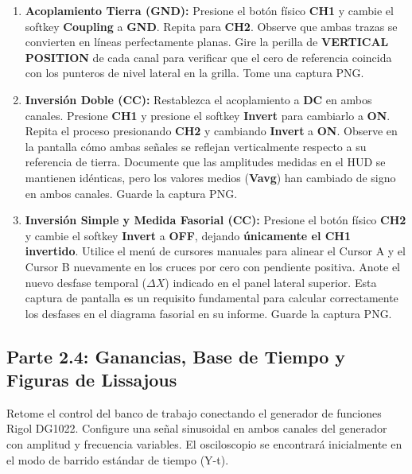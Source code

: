 \documentclass[12pt, letterpaper]{article}
\begin{document}
\begin{enumerate}[label=\textbf{2.3.\alph*)}]
    \item \textbf{Acoplamiento Tierra (GND):} Presione el botón físico \textbf{CH1} y cambie el softkey \textbf{Coupling} a \textbf{GND}. Repita para \textbf{CH2}. Observe que ambas trazas se convierten en líneas perfectamente planas. Gire la perilla de \textbf{VERTICAL POSITION} de cada canal para verificar que el cero de referencia coincida con los punteros de nivel lateral en la grilla. Tome una captura PNG.
    
    \item \textbf{Inversión Doble (CC):} Restablezca el acoplamiento a \textbf{DC} en ambos canales. Presione \textbf{CH1} y presione el softkey \textbf{Invert} para cambiarlo a \textbf{ON}. Repita el proceso presionando \textbf{CH2} y cambiando \textbf{Invert} a \textbf{ON}. Observe en la pantalla cómo ambas señales se reflejan verticalmente respecto a su referencia de tierra. Documente que las amplitudes medidas en el HUD se mantienen idénticas, pero los valores medios (\textbf{Vavg}) han cambiado de signo en ambos canales. Guarde la captura PNG.
    
    \item \textbf{Inversión Simple y Medida Fasorial (CC):} Presione el botón físico \textbf{CH2} y cambie el softkey \textbf{Invert} a \textbf{OFF}, dejando \textbf{únicamente el CH1 invertido}. Utilice el menú de cursores manuales para alinear el Cursor A y el Cursor B nuevamente en los cruces por cero con pendiente positiva. Anote el nuevo desfase temporal ($\Delta X$) indicado en el panel lateral superior. Esta captura de pantalla es un requisito fundamental para calcular correctamente los desfases en el diagrama fasorial en su informe. Guarde la captura PNG.
\end{enumerate}

\subsection{Parte 2.4: Ganancias, Base de Tiempo y Figuras de Lissajous}

Retome el control del banco de trabajo conectando el generador de funciones Rigol DG1022. Configure una señal sinusoidal en ambos canales del generador con amplitud y frecuencia variables. El osciloscopio se encontrará inicialmente en el modo de barrido estándar de tiempo (Y-t).
\end{document}
